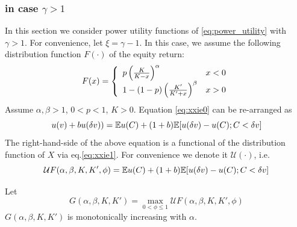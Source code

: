 \documentclass{article}
\begin{document}

\subsubsection[in case gamma > 1]{in case $\gamma > 1$}
In this section we consider power utility functions of
\eqref{eq:power_utility} with $\gamma > 1$. For convenience,
let $\xi = \gamma - 1$. In this case, we assume the following
distribution function $F(\cdot)$ of the equity return:
\begin{equation*}
  F(x) = \left\{
  \begin{array}{ll}
    p \left(
    {K \over K - x}
    \right)^\alpha & x < 0 \\
    1 - (1 - p) \left(
    {K' \over K' + x}
    \right)^\beta & x > 0
  \end{array}
  \right.
\end{equation*}
Assume $\alpha, \beta > 1$, $0 < p < 1$, $K > 0$. Equation
\eqref{eq:xxie0} can be re-arranged as
\[
u(v) + b u(\delta v))
=
\mathbb{E} u(C) + (1 + b) \mathbb{E} [u(\delta v) - u(C); C < \delta v]
\]
The right-hand-side of the above equation is a functional of the
distribution function of $X$ via eq.\eqref{eq:xxie1}. For convenience
we denote it $\mathcal U(\cdot)$, i.e.
\[
\mathcal U F (\alpha, \beta, K, K', \phi)
= 
\mathbb{E} u(C) + (1 + b) \mathbb{E} [u(\delta v) - u(C); C < \delta v]
\]
\begin{theorem}
  Let
  \[
  G(\alpha, \beta, K, K') =
  \max_{0 < \phi \leq 1} \mathcal U F(\alpha, \beta, K, K', \phi)
  \]
  $G(\alpha, \beta, K, K')$ is monotonically increasing with
  $\alpha$.
\end{theorem}
\end{document}
